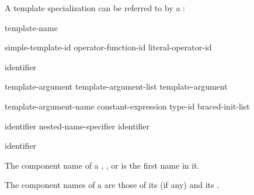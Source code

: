 \documentclass{wg21}
\begin{document}
\pnum
A template specialization  can be referred to by a
:

\begin{bnf}
    \br
    template-name \terminal{<}  \terminal{>}
\end{bnf}

\begin{bnf}
    \br
    simple-template-id\br
    operator-function-id \terminal{<}  \terminal{>}\br
    literal-operator-id \terminal{<}  \terminal{>}
\end{bnf}

\begin{bnf}
    \br
    identifier
\end{bnf}

\begin{bnf}
    \br
    template-argument \br
    template-argument-list \terminal{,} template-argument 
\end{bnf}

\begin{bnf}
    \br
    template-argument-name\br
    \br
    constant-expression\br
    type-id\br
    braced-init-list
\end{bnf}

\begin{bnf}
    \br
     identifier\br
    nested-name-specifier  identifier\br
\end{bnf}

\begin{addedblock}
\begin{bnf}
    \br
    identifier\br
\end{bnf}
\end{addedblock}

\pnum
{}%
The component name of a
,
, or
is the first name in it.


\ednote{[...]}

\pnum
The component names of a  are
those of its  (if any) and
its .
\end{document}
